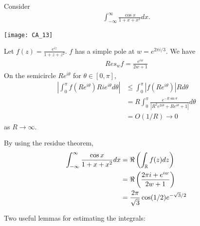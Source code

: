 \documentclass[a4paper]{article}
\begin{document}
\begin{eg}
Consider
\begin{equation*}
\begin{aligned}
\int_{-\infty}^\infty \frac{\cos x}{1+x+x^2} dx.
\end{aligned}
\end{equation*}

\texttt{[image: CA\_13]}

Let $f(z) = \frac{e^{iz}}{1+z+z^2}$. $f$ has a simple pole at $w = e^{2\pi i/3}$. We have
\begin{equation*}
\begin{aligned}
Res_w f = \frac{e^{iw}}{2w+1}
\end{aligned}
\end{equation*}
On the semicircle $Re^{i\theta}$ for $\theta \in [0,\pi]$,
\begin{equation*}
\begin{aligned}
\left|\int_0^\pi f(Re^{i\theta}) Rie^{i\theta} d\theta\right| &\leq \int_0^\pi |f(Re^{i\theta})| R d\theta\\
&= R\int_0^\pi \frac{e^{-R\sin\theta}}{|R^2 e^{2i\theta}+Re^{i\theta}+1|}d\theta\\
&= O(1/R) \to 0
\end{aligned}
\end{equation*}
as $R \to \infty$.

By using the residue theorem, 
\begin{equation*}
\begin{aligned}
\int_{-\infty}^\infty \frac{\cos x}{1+x+x^2} dx &= \Re\left(\int_{\mathbb{R}} f(z) dz\right)\\
&= \Re\left(\frac{2\pi i+e^{iw}}{2w+1}\right)\\
&= \frac{2\pi}{\sqrt{3}} \cos(1/2) e^{-\sqrt{3}/2}
\end{aligned}
\end{equation*}
\end{eg}

Two useful lemmas for estimating the integrals:
\end{document}
